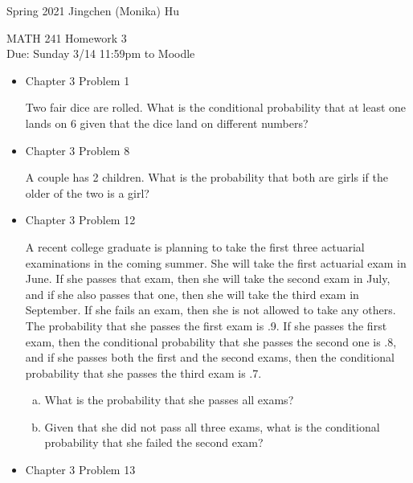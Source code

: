 \documentclass[11pt]{article}
\begin{document}
\enlargethispage{\baselineskip}

Spring 2021 \hfill Jingchen (Monika) Hu\\

\begin{center}
{\huge MATH 241 Homework 3}	\\
Due: Sunday 3/14 11:59pm to Moodle
\end{center}
\vspace{0.5cm}

\begin{itemize}


    \item
    Chapter 3 Problem 1
    
    Two fair dice are rolled. What is the conditional probability that at least one lands on 6 given that the dice land on different numbers?
    
    
    \item
    Chapter 3 Problem 8
    
    A couple has 2 children. What is the probability that both are girls if the older of the two is a girl?

    \item
    Chapter 3 Problem  12
    
    A recent college graduate is planning to take the first three actuarial examinations in the coming summer. She will take the first actuarial exam in June. If she passes that exam, then she will take the second exam in July, and if she also passes that one, then she will take the third exam in September. If she fails an exam, then she is not allowed to take any others. The probability that she passes the first exam is .9. If she passes the first exam, then the conditional probability that she passes the second one is .8, and if she passes both the first and the second exams, then the conditional probability that she passes the third exam is .7.
    
    \begin{enumerate}[(a)]
    \item What is the probability that she passes all exams?
    
    \item Given that she did not pass all three exams, what is the conditional probability that she failed the second exam?
    \end{enumerate}

    \item
    Chapter 3 Problem  13
    

\end{itemize}
\end{document}
